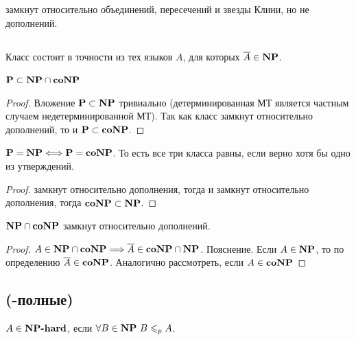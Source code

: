 \begin{note} 
\np замкнут относительно объединений, пересечений и звезды Клини, но не дополнений.
\end{note}

\subsection{\conp}

\begin{definition}
Класс \conp состоит в точности из тех языков $A$, для которых $\overline{A} \in \textbf{NP}$.
\end{definition}

\begin{statement}
$\textbf{P} \subset \textbf{NP} \cap \textbf{coNP}$
\end{statement}

\begin{proof}
Вложение $\textbf{P} \subset \textbf{NP}$ тривиально (детерминированная МТ является частным случаем недетерминированной МТ). Так как класс \p замкнут относительно дополнений, то и $\textbf{P} \subset \textbf{coNP}$. 
\end{proof}

\begin{statement}
$\textbf{P} = \textbf{NP} \Longleftrightarrow \textbf{P} = \textbf{coNP}$. То есть все три класса равны, если верно хотя бы одно из утверждений.
\end{statement}

\begin{proof}
\p замкнут относительно дополнения, тогда и \np замкнут относительно дополнения, тогда $\textbf{coNP} \subset \textbf{NP}$. 
\end{proof}

\begin{note}
$\textbf{NP} \cap \textbf{coNP}$ замкнут относительно дополнений.
\end{note}

\begin{proof}
$A \in \textbf{NP} \cap \textbf{coNP} \Longrightarrow \overline{A} \in \textbf{coNP} \cap \textbf{NP}$. Пояснение. Если $A \in \textbf{NP}$, то по определению $\overline{A} \in \textbf{coNP}$. Аналогично рассмотреть, если $A \in \textbf{coNP}$
\end{proof}

\subsection{\npc (\np-полные)}

\begin{definition}
$A \in \textbf{NP-hard}$, если $\forall B \in \textbf{NP} \ B \leqslant_p A$.
\end{definition} 

